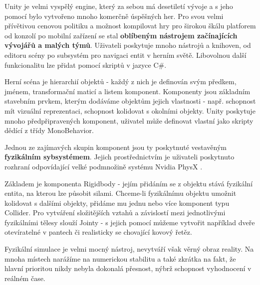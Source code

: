Unity je velmi vyspělý engine, který za sebou má desetiletí vývoje a s jeho pomocí bylo vytvořeno mnoho komerčně úspěšných her. Pro svou velmi přívětivou cenovou politiku a možnost kompilovat hry pro širokou škálu platforem od konzolí po mobilní zařízení se stal \textbf{oblíbeným nástrojem začínajících vývojářů a malých týmů}. Uživateli poskytuje mnoho nástrojů a knihoven, od editoru scény po subsystém pro navigaci entit v herním světě. Libovolnou další funkcionalitu lze přidat pomocí skriptů v jazyce C\#. 

Herní scéna je hierarchií objektů - každý z nich je definován svým předkem, jménem, transformační maticí a listem komponent. Komponenty jsou základním stavebním prvkem, kterým dodáváme objektům jejich vlastnosti - např. schopnost mít vizuální reprezentaci, schopnost kolidovat s okolními objekty. Unity poskytuje mnoho předpřipravených komponent, uživatel může definovat vlastní jako skripty dědící z třídy MonoBehavior.

Jednou ze zajímavých skupin komponent jsou ty poskytnuté vestavěným \textbf{fyzikálním sybsystémem}. Jejich prostřednictvím je uživateli poskytnuto rozhraní odpovídající velké podmnožině systému Nvidia PhysX \cite{PhysX}. 

Základem je komponenta Rigidbody - jejím přidáním se z objektu stává fyzikální entita, na kterou lze působit silami. Chceme-li fyzikálnímu objektu umožnit kolidovat s dalšími objekty, přidáme mu jednu nebo více komponent typu Collider. Pro vytváření složitějších vztahů a závislostí mezi jednotlivými fyzikálními tělesy slouží Jointy - s jejich pomocí můžeme vytvořit například dveře otevíratelné v pantech či realisticky se chovající kovový řetěz.

Fyzikální simulace je velmi mocný nástroj, nevytváří však věrný obraz reality. Na mnoha místech narážíme na numerickou stabilitu a také zkrátka na fakt, že hlavní prioritou nikdy nebyla dokonalá přesnost, nýbrž schopnost vyhodnocení v reálném čase.
